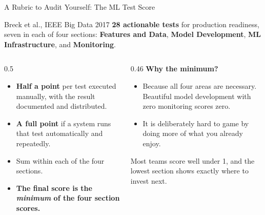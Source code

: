 \begin{frame}{A Rubric to Audit Yourself: The ML Test Score}

    \begin{block}{Breck et al., IEEE Big Data 2017}
        \textbf{28 actionable tests} for production readiness, seven in each of four sections:
        \textbf{Features and Data}, \textbf{Model Development}, \textbf{ML Infrastructure}, and
        \textbf{Monitoring}.
    \end{block}

    \vspace{0.15em}
    \begin{columns}[T]
        \begin{column}{0.5\textwidth}
            \begin{tcolorbox}[colback=green!5, colframe=green!50!black, title=\scriptsize How it is scored]
                \scriptsize
                \begin{itemize}
                    \item \textbf{Half a point} per test executed manually, with the result documented and
                          distributed.
                    \item \textbf{A full point} if a system runs that test automatically and repeatedly.
                    \item Sum within each of the four sections.
                    \item \textbf{The final score is the \emph{minimum} of the four section scores.}
                \end{itemize}
            \end{tcolorbox}
        \end{column}
        \begin{column}{0.46\textwidth}
            \scriptsize
            \textbf{Why the minimum?}
            \begin{itemize}
                \item Because all four areas are necessary. Beautiful model development with zero monitoring
                      scores zero.
                \item It is deliberately hard to game by doing more of what you already enjoy.
            \end{itemize}
            \vspace{0.12em}
            \begin{tcolorbox}[colback=yellow!8, colframe=yellow!50!black, boxrule=0.5pt]
                \scriptsize Most teams score well under 1, and the lowest section shows exactly where to
                invest next.
            \end{tcolorbox}
        \end{column}
    \end{columns}


\end{frame}
